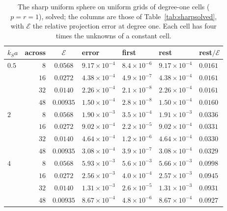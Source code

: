 \documentclass[11pt,a4paper]{article}
\newcommand{\cE}{\mathcal{E}}
\begin{document}
\begin{table}[htbp]
\centering
\caption{The sharp uniform sphere on uniform grids of degree-one cells ($p=r=1$), solved; the columns
are those of Table~\ref{tab:sharpsolved}, with $\cE$ the relative projection error at degree one. Each
cell has four times the unknowns of a constant cell.}\label{tab:sharpdeg1}
\small
\begin{tabular}{@{}lrcllll@{}}
\toprule
$k_Sa$ & across & $\cE$ & error & first & rest & rest$/\cE$ \\
\midrule
$0.5$ & $8$  & $0.0568$  & $9.17\times10^{-4}$ & $8.4\times10^{-6}$ & $9.17\times10^{-4}$ & $0.0161$ \\
      & $16$ & $0.0272$  & $4.38\times10^{-4}$ & $4.9\times10^{-7}$ & $4.38\times10^{-4}$ & $0.0161$ \\
      & $32$ & $0.0140$  & $2.26\times10^{-4}$ & $2.1\times10^{-8}$ & $2.26\times10^{-4}$ & $0.0161$ \\
      & $48$ & $0.00935$ & $1.50\times10^{-4}$ & $2.8\times10^{-8}$ & $1.50\times10^{-4}$ & $0.0160$ \\
\midrule
$2$   & $8$  & $0.0568$  & $1.90\times10^{-3}$ & $3.5\times10^{-4}$ & $1.91\times10^{-3}$ & $0.0336$ \\
      & $16$ & $0.0272$  & $9.02\times10^{-4}$ & $2.2\times10^{-5}$ & $9.02\times10^{-4}$ & $0.0331$ \\
      & $32$ & $0.0140$  & $4.64\times10^{-4}$ & $1.2\times10^{-6}$ & $4.64\times10^{-4}$ & $0.0330$ \\
      & $48$ & $0.00935$ & $3.08\times10^{-4}$ & $3.9\times10^{-7}$ & $3.08\times10^{-4}$ & $0.0329$ \\
\midrule
$4$   & $8$  & $0.0568$  & $5.93\times10^{-3}$ & $5.6\times10^{-3}$ & $5.66\times10^{-3}$ & $0.0998$ \\
      & $16$ & $0.0272$  & $2.56\times10^{-3}$ & $4.0\times10^{-4}$ & $2.57\times10^{-3}$ & $0.0945$ \\
      & $32$ & $0.0140$  & $1.31\times10^{-3}$ & $2.6\times10^{-5}$ & $1.31\times10^{-3}$ & $0.0931$ \\
      & $48$ & $0.00935$ & $8.67\times10^{-4}$ & $4.8\times10^{-6}$ & $8.67\times10^{-4}$ & $0.0927$ \\
\bottomrule
\end{tabular}
\end{table}
\end{document}
